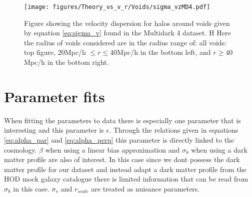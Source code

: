 \begin{figure}[htbp]
    \texttt{[image: figures/Theory\_vs\_v\_r/Voids/sigma\_vzMD4.pdf]}
    \caption{Figure showing the velocity dispersion for halos around voids given by equation \ref{eq:sigma_v} found in the Multidark 4 dataset. H Here the radius of voids considered are in the radius range of: all voids: top figure, $20$Mpc/h $\leq r\leq 40$Mpc/h in the bottom left, and $r\geq 40$Mpc/h in the bottom right.}
    \label{fig:sigmavMD4}
\end{figure}
\section{Parameter fits}
When fitting the parameters to data there is especially one parameter that is interesting and this parameter is $\epsilon$. Through the relations given in 
equations \ref{eq:alpha_par} and \ref{eq:alpha_perp} this parameter is directly linked to the cosmology. $\beta$ when using a linear bias approximation and $\sigma_8$
when using a dark matter profile are also of interest. In this case since we dont possess the dark matter profile for our dataset and instead adapt a dark matter profile from the HOD mock galaxy catalogue there is limited information that can be read from $\sigma_8$ in this case. $\sigma_v$ and $r_{scale}$ are treated as nuisance parameters.

